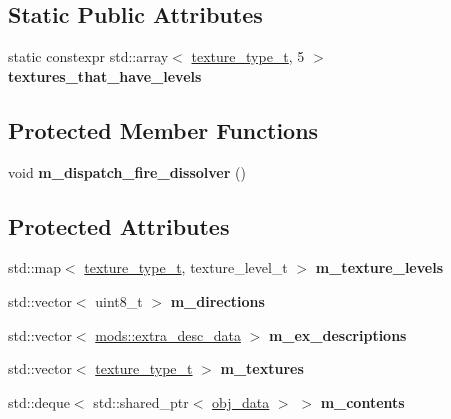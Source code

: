 \subsection*{Static Public Attributes}
\begin{DoxyCompactItemize}
\item 
static constexpr std\+::array$<$ \hyperlink{structroom__data_a9552b46091ee649079e41f04f9543b8e}{texture\+\_\+type\+\_\+t}, 5 $>$ {\bfseries textures\+\_\+that\+\_\+have\+\_\+levels}
\end{DoxyCompactItemize}
\subsection*{Protected Member Functions}
\begin{DoxyCompactItemize}
\item 
\mbox{\label{structroom__data_af1e3735077d459383ec20985eda26459}} 
void {\bfseries m\+\_\+dispatch\+\_\+fire\+\_\+dissolver} ()
\end{DoxyCompactItemize}
\subsection*{Protected Attributes}
\begin{DoxyCompactItemize}
\item 
\mbox{\label{structroom__data_a99d435147a074558d8c9885b91d79817}} 
std\+::map$<$ \hyperlink{structroom__data_a9552b46091ee649079e41f04f9543b8e}{texture\+\_\+type\+\_\+t}, texture\+\_\+level\+\_\+t $>$ {\bfseries m\+\_\+texture\+\_\+levels}
\item 
\mbox{\label{structroom__data_a0ffb7df8066794ff035aa6aab126cb82}} 
std\+::vector$<$ uint8\+\_\+t $>$ {\bfseries m\+\_\+directions}
\item 
\mbox{\label{structroom__data_acf2fa02a703a383c7d69e75ec7d2d606}} 
std\+::vector$<$ \hyperlink{structmods_1_1extra__desc__data}{mods\+::extra\+\_\+desc\+\_\+data} $>$ {\bfseries m\+\_\+ex\+\_\+descriptions}
\item 
\mbox{\label{structroom__data_a7013d2fb07dffd6f9d12c8f9d757daa5}} 
std\+::vector$<$ \hyperlink{structroom__data_a9552b46091ee649079e41f04f9543b8e}{texture\+\_\+type\+\_\+t} $>$ {\bfseries m\+\_\+textures}
\item 
\mbox{\label{structroom__data_a800e7e5c6c49f9d96b62922b9b183b21}} 
std\+::deque$<$ std\+::shared\+\_\+ptr$<$ \hyperlink{structobj__data}{obj\+\_\+data} $>$ $>$ {\bfseries m\+\_\+contents}
\end{DoxyCompactItemize}


